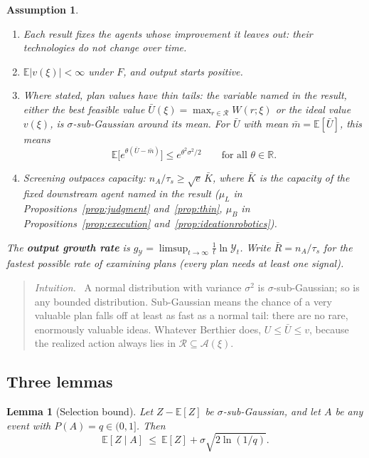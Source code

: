 \documentclass[11pt]{article}
\newcommand{\Ber}{\textcolor{ber}{Berthier}}
\newtheorem{assumption}{Assumption}
\newtheorem{lemma}{Lemma}
\theoremstyle{remark}
\newenvironment{intuition}{\begin{quote}\small\color{muted}\textit{Intuition.}\ }{\end{quote}}
\newcommand{\E}{\mathbb{E}}
\newcommand{\Ycal}{\mathcal{Y}}
\newcommand{\Rcal}{\mathcal{R}}
\newcommand{\Acal}{\mathcal{A}}
\begin{document}
\begin{assumption}\label{ass:results}
\begin{enumerate}
  \item[(a)] Each result fixes the agents whose improvement it leaves out: their technologies do not change over time.
  \item[(b)] $\E|v(\xi)|<\infty$ under $F$, and output starts positive.
  \item[(c)] Where stated, plan values have thin tails: the variable named in the result, either the best feasible value $\bar U(\xi)=\max_{r\in\Rcal}W(r;\xi)$ or the ideal value $v(\xi)$, is $\sigma$-sub-Gaussian around its mean. For $\bar U$ with mean $\bar m=\E[\bar U]$, this means
  \[
  \E\Big[e^{\theta(\bar U-\bar m)}\Big]\le e^{\theta^2\sigma^2/2}\qquad\text{for all }\theta\in\mathbb{R}.
  \]
  \item[(d)] Screening outpaces capacity: $n_A/\tau_s\ge\sqrt e\,\bar K$, where $\bar K$ is the capacity of the fixed downstream agent named in the result ($\mu_L$ in Propositions~\ref{prop:judgment} and~\ref{prop:thin}, $\mu_B$ in Propositions~\ref{prop:execution} and~\ref{prop:ideationrobotics}).
\end{enumerate}
The \textbf{output growth rate} is $g_{\Ycal}=\limsup_{t\to\infty}\frac1t\ln\Ycal_t$. Write $\bar R=n_A/\tau_s$ for the fastest possible rate of examining plans (every plan needs at least one signal).
\end{assumption}

\begin{intuition}
A normal distribution with variance $\sigma^2$ is $\sigma$-sub-Gaussian; so is any bounded distribution. Sub-Gaussian means the chance of a very valuable plan falls off at least as fast as a normal tail: there are no rare, enormously valuable ideas. Whatever \Ber{} does, $U\le\bar U\le v$, because the realized action always lies in $\Rcal\subseteq\Acal(\xi)$.
\end{intuition}

\subsection{Three lemmas}

\begin{lemma}[Selection bound]\label{lem:selection}
Let $Z-\E[Z]$ be $\sigma$-sub-Gaussian, and let $A$ be any event with $P(A)=q\in(0,1]$. Then
\[
\E[Z\mid A]\ \le\ \E[Z]+\sigma\sqrt{2\ln(1/q)}.
\]
\end{lemma}
\end{document}
